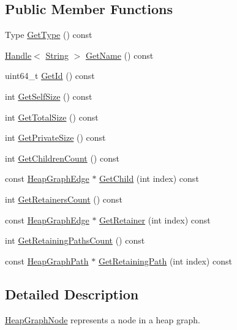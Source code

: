\subsection*{Public Member Functions}
\begin{DoxyCompactItemize}
\item 
Type \hyperlink{classv8_1_1_heap_graph_node_a5e07fc855bded52229e62b855fa08c5d}{Get\+Type} () const 
\item 
\hyperlink{classv8_1_1_handle}{Handle}$<$ \hyperlink{classv8_1_1_string}{String} $>$ \hyperlink{classv8_1_1_heap_graph_node_af5f24ee6c07a57814e18bd317cb5576a}{Get\+Name} () const 
\item 
uint64\+\_\+t \hyperlink{classv8_1_1_heap_graph_node_a400431a5073604742b13372ad901bd78}{Get\+Id} () const 
\item 
int \hyperlink{classv8_1_1_heap_graph_node_acd3bd8860aa399ac56fa8a0229af7b85}{Get\+Self\+Size} () const 
\item 
int \hyperlink{classv8_1_1_heap_graph_node_af2621cf83d9e06ce1f45a4c207f3475b}{Get\+Total\+Size} () const 
\item 
int \hyperlink{classv8_1_1_heap_graph_node_ac010b7bb0f9e3821604235a61429ab87}{Get\+Private\+Size} () const 
\item 
int \hyperlink{classv8_1_1_heap_graph_node_a0a49abe006755dd5536d15ae42f552d4}{Get\+Children\+Count} () const 
\item 
const \hyperlink{classv8_1_1_heap_graph_edge}{Heap\+Graph\+Edge} $\ast$ \hyperlink{classv8_1_1_heap_graph_node_ac3435611573e58b6614aeaab68442905}{Get\+Child} (int index) const 
\item 
int \hyperlink{classv8_1_1_heap_graph_node_a9de00d0733343b4b16823654813c22a1}{Get\+Retainers\+Count} () const 
\item 
const \hyperlink{classv8_1_1_heap_graph_edge}{Heap\+Graph\+Edge} $\ast$ \hyperlink{classv8_1_1_heap_graph_node_a260c115d00b7960a08ea34c6a8bee058}{Get\+Retainer} (int index) const 
\item 
int \hyperlink{classv8_1_1_heap_graph_node_a9d1d049b6ecbc94d2753f10af782ba83}{Get\+Retaining\+Paths\+Count} () const 
\item 
const \hyperlink{classv8_1_1_heap_graph_path}{Heap\+Graph\+Path} $\ast$ \hyperlink{classv8_1_1_heap_graph_node_a0145bac669b571f6ed3e04722402468c}{Get\+Retaining\+Path} (int index) const 
\end{DoxyCompactItemize}


\subsection{Detailed Description}
\hyperlink{classv8_1_1_heap_graph_node}{Heap\+Graph\+Node} represents a node in a heap graph. 

